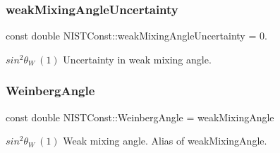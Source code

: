 \subsubsection{\texorpdfstring{weak\+Mixing\+Angle\+Uncertainty}{weakMixingAngleUncertainty}}
{\footnotesize\ttfamily const double N\+I\+S\+T\+Const\+::weak\+Mixing\+Angle\+Uncertainty = 0.}

$sin^2 \theta_W \ (1)$ Uncertainty in weak mixing angle. \mbox{\label{group___weak_mixing_angle_gaa27d3628b9e064d9d8d998be81b6adf0}} 
\subsubsection{\texorpdfstring{Weinberg\+Angle}{WeinbergAngle}}
{\footnotesize\ttfamily const double N\+I\+S\+T\+Const\+::\+Weinberg\+Angle = weak\+Mixing\+Angle}

$sin^2 \theta_W \ (1)$ Weak mixing angle. Alias of weak\+Mixing\+Angle. 